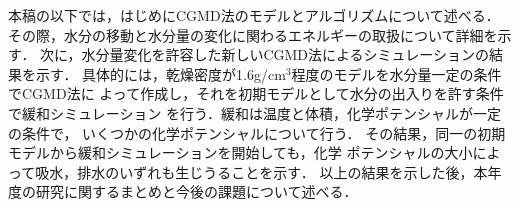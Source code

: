 本稿の以下では，はじめにCGMD法のモデルとアルゴリズムについて述べる．
その際，水分の移動と水分量の変化に関わるエネルギーの取扱について詳細を示す．
次に，水分量変化を許容した新しいCGMD法によるシミュレーションの結果を示す．
具体的には，乾燥密度が1.6g/cm$^3$程度のモデルを水分量一定の条件でCGMD法に
よって作成し，それを初期モデルとして水分の出入りを許す条件で緩和シミュレーション
を行う．緩和は温度と体積，化学ポテンシャルが一定の条件で，
いくつかの化学ポテンシャルについて行う．
その結果，同一の初期モデルから緩和シミュレーションを開始しても，化学
ポテンシャルの大小によって吸水，排水のいずれも生じうることを示す．
以上の結果を示した後，本年度の研究に関するまとめと今後の課題について述べる．
